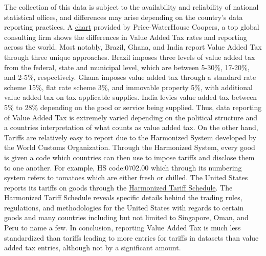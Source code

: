 \documentclass[12pt]{article}
\begin{document}
The collection of this data is subject to the availability and reliability of national statistical offices, and differences may arise depending on the country’s data reporting practices. A \href{https://taxsummaries.pwc.com/quick-charts/value-added-tax-vat-rates}{chart} provided by Price-WaterHouse Coopers, a top global consulting firm shows the differences in Value Added Tax rates and reporting across the world. Most notably, Brazil, Ghana, and India report Value Added Tax through three unique approaches. Brazil imposes three levels of value added tax from the federal, state and municipal level, which are between 5-30\%, 17-20\%, and 2-5\%, respectively. Ghana imposes value added tax through a standard rate scheme 15\%, flat rate scheme 3\%, and immovable property 5\%, with additional value added tax on tax applicable supplies. India levies value added tax between 5\% to 28\% depending on the good or service being supplied. Thus, data reporting of Value Added Tax is extremely varied depending on the political structure and a countries interpretation of what counts as value added tax. On the other hand, Tariffs are relatively easy to report due to the Harmonized System developed by the World Customs Organization. Through the Harmonized System, every good is given a code which countries can then use to impose tariffs and disclose them to one another. For example, HS code:0702.00 which through its numbering system refers to tomatoes which are either fresh or chilled. The United States reports its tariffs on goods through the \href{https://hts.usitc.gov/}{Harmonized Tariff Schedule}. The Harmonized Tariff Schedule reveals specific details behind the trading rules, regulations, and methodologies for the United States with regards to certain goods and many countries including but not limited to Singapore, Oman, and Peru to name a few. In conclusion, reporting Value Added Tax is much less standardized than tariffs leading to more entries for tariffs in datasets than value added tax entries, although not by a significant amount.
\end{document}
